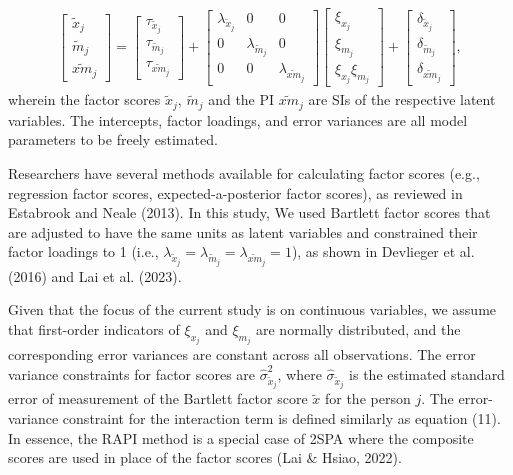 \documentclass[
  man,mask]{apa6}
\begin{document}
\begin{align}
    \begin{bmatrix}
        \tilde{x}_{j} \\ 
        \tilde{m}_{j} \\
        \widetilde{xm}_{j} 
    \end{bmatrix} = 
    \begin{bmatrix}
        \tau_{\tilde{x}_{j}} \\
        \tau_{\tilde{m}_{j}} \\ 
        \tau_{\widetilde{xm}_{j}}
    \end{bmatrix} + 
    \begin{bmatrix}
        \lambda_{\tilde{x}_{j}} & 0 & 0 \\
        0 & \lambda_{\tilde{m}_{j}} & 0 \\ 
        0 & 0 & \lambda_{\widetilde{xm}_{j}} 
    \end{bmatrix} 
    \begin{bmatrix}
        \xi_{x_{j}} \\  
        \xi_{m_{j}} \\
        \xi_{x_{j}}\xi_{m_{j}}
    \end{bmatrix} +
    \begin{bmatrix}
        \delta_{\tilde{x}_{j}} \\
        \delta_{\tilde{m}_{j}} \\ 
        \delta_{\widetilde{xm}_{j}}
    \end{bmatrix},
\end{align}
wherein the factor scores \(\tilde{x}_{j}\), \(\tilde{m}_{j}\) and the PI \(\widetilde{xm}_{j}\) are SIs of the respective latent variables. The intercepts, factor loadings, and error variances are all model parameters to be freely estimated.

Researchers have several methods available for calculating factor scores (e.g., regression factor scores, expected-a-posterior factor scores), as reviewed in Estabrook and Neale (2013). In this study, We used Bartlett factor scores that are adjusted to have the same units as latent variables and constrained their factor loadings to 1 (i.e., \(\lambda_{\tilde{x}_{j}} = \lambda_{\tilde{m}_{j}} = \lambda_{\widetilde{xm}_{j}} = 1\)), as shown in Devlieger et al. (2016) and Lai et al. (2023).

Given that the focus of the current study is on continuous variables, we assume that first-order indicators of \(\xi_{x_{j}}\) and \(\xi_{m_{j}}\) are normally distributed, and the corresponding error variances are constant across all observations. The error variance constraints for factor scores are \(\hat{\sigma}_{\tilde{x}_{j}}^2\), where \(\hat{\sigma}_{\tilde{x}_{j}}\) is the estimated standard error of measurement of the Bartlett factor score \(\tilde{x}\) for the person \(j\). The error-variance constraint for the interaction term is defined similarly as equation (11). In essence, the RAPI method is a special case of 2SPA where the composite scores are used in place of the factor scores (Lai \& Hsiao, 2022).
\end{document}
